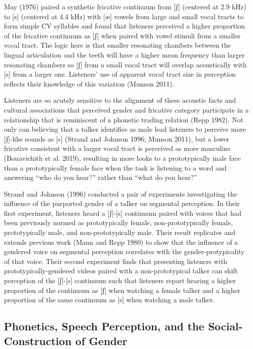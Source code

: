 \documentclass[
  letterpaper,
  DIV=11,
  numbers=noendperiod]{scrartcl}
\begin{document}
May (1976) paired a synthetic fricative continuum from {[}ʃ{]} (centered
at 2.9 kHz) to {[}s{]} (centered at 4.4 kHz) with {[}æ{]} vowels from
large and small vocal tracts to form simple CV syllables and found that
listeners perceived a higher proportion of the fricative continuum as
{[}ʃ{]} when paired with vowel stimuli from a smaller vocal tract. The
logic here is that smaller resonating chambers between the lingual
articulation and the teeth will have a higher mean frequency than larger
resonating chambers so {[}ʃ{]} from a small vocal tract will overlap
acoustically with {[}s{]} from a larger one. Listeners' use of apparent
vocal tract size in perception reflects their knowledge of this
variation (Munson 2011).

Listeners are so acutely sensitive to the alignment of these acoustic
facts and cultural associations that perceived gender and fricative
category participate in a relationship that is reminiscent of a phonetic
trading relation (Repp 1982). Not only can believing that a talker
identifies as male lead listeners to perceive more {[}ʃ{]}-like sounds
as {[}s{]} (Strand and Johnson 1996; Munson 2011), but a lower fricative
consistent with a larger vocal tract is perceived as more masculine
(Bouavichith et al. 2019), resulting in more looks to a prototypically
male face than a prototypically female face when the task is listening
to a word and answering ``who do you hear?'' rather than ``what do you
hear?''

Strand and Johnson (1996) conducted a pair of experiments investigating
the influence of the purported gender of a talker on segmental
perception. In their first experiment, listeners heard a {[}ʃ{]}-{[}s{]}
continuum paired with voices that had been previously normed as
prototypically female, non-prototypically female, prototypically male,
and non-prototypically male. Their result replicates and extends
previous work (Mann and Repp 1980) to show that the influence of a
gendered voice on segmental perception correlates with the
gender-protypicality of that voice. Their second experiment finds that
presenting listeners with prototypically-gendered videos paired with a
non-prototypical talker can shift perception of the {[}ʃ{]}-{[}s{]}
continuum such that listeners report hearing a higher proportion of the
continuum as {[}ʃ{]} when watching a female talker and a higher
proportion of the same continuum as {[}s{]} when watching a male talker.

\subsection{Phonetics, Speech Perception, and the Social-Construction of
Gender}\label{sec-gender}
\end{document}
